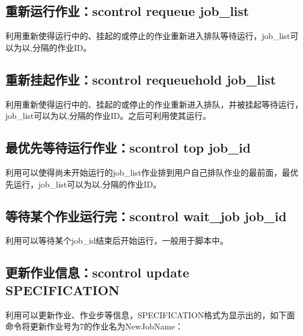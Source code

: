 \subsection{重新运行作业：scontrol requeue job\_list}
利用重新使得运行中的、挂起的或停止的作业重新进入排队等待运行，job\_list可以为以,分隔的作业ID。

\subsection{重新挂起作业：scontrol requeuehold job\_list}
利用重新使得运行中的、挂起的或停止的作业重新进入排队，并被挂起等待运行，job\_list可以为以,分隔的作业ID。之后可利用使其运行。


\subsection{最优先等待运行作业：scontrol top job\_id}
利用可以使得尚未开始运行的job\_list作业排到用户自己排队作业的最前面，最优先运行，job\_list可以为以,分隔的作业ID。


\subsection{等待某个作业运行完：scontrol wait\_job job\_id}
利用可以等待某个job\_id结束后开始运行，一般用于脚本中。


\subsection{更新作业信息：scontrol update SPECIFICATION}
利用可以更新作业、作业步等信息，SPECIFICATION格式为显示出的，如下面命令将更新作业号为7的作业名为NewJobName：


